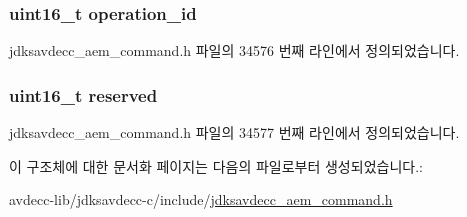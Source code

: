 \subsubsection[{\texorpdfstring{operation\+\_\+id}{operation_id}}]{\setlength{\rightskip}{0pt plus 5cm}uint16\+\_\+t operation\+\_\+id}\hypertarget{structjdksavdecc__aem__command__abort__operation__response_a5b1b19c38a3b340cfc6ebcb9eeb153e2}{}\label{structjdksavdecc__aem__command__abort__operation__response_a5b1b19c38a3b340cfc6ebcb9eeb153e2}


jdksavdecc\+\_\+aem\+\_\+command.\+h 파일의 34576 번째 라인에서 정의되었습니다.

\subsubsection[{\texorpdfstring{reserved}{reserved}}]{\setlength{\rightskip}{0pt plus 5cm}uint16\+\_\+t reserved}\hypertarget{structjdksavdecc__aem__command__abort__operation__response_a5a6ed8c04a3db86066924b1a1bf4dad3}{}\label{structjdksavdecc__aem__command__abort__operation__response_a5a6ed8c04a3db86066924b1a1bf4dad3}


jdksavdecc\+\_\+aem\+\_\+command.\+h 파일의 34577 번째 라인에서 정의되었습니다.



이 구조체에 대한 문서화 페이지는 다음의 파일로부터 생성되었습니다.\+:\begin{DoxyCompactItemize}
\item 
avdecc-\/lib/jdksavdecc-\/c/include/\hyperlink{jdksavdecc__aem__command_8h}{jdksavdecc\+\_\+aem\+\_\+command.\+h}\end{DoxyCompactItemize}
